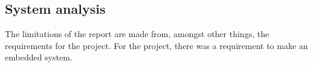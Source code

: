 \subsection{System analysis}

The limitations of the report are made from, amongst other things, the requirements for the project. For the project, there was a requirement to make an embedded system.